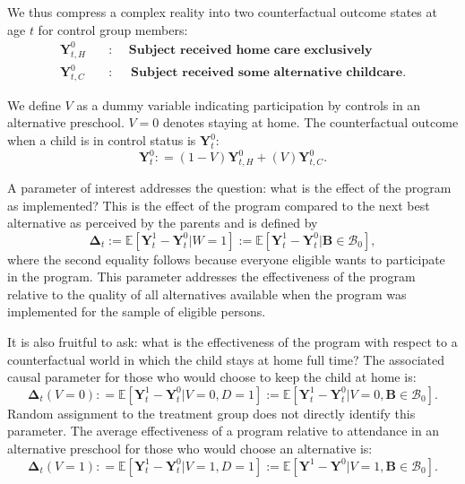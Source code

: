 We thus compress a complex reality into two counterfactual outcome states at age $t$ for control group members:
\begin{align*}
\bm{Y}_{t,H}^0 \quad &: \quad \textbf{ Subject received home care exclusively} \\
\bm{Y}_{t,C}^0 \quad &: \quad \textbf{ Subject received some alternative childcare}.
\end{align*}

We define $V$ as a dummy variable indicating participation by controls in an alternative preschool. $V=0$ denotes staying at home. The counterfactual outcome when a child is in control status is $\bm{Y}^0_t$:
\begin{equation}
\bm{Y}^0_t : = \left( 1 - V \right) \bm{Y}^0_{t,H} + \left( V \right) \bm{Y}^0_{t,C}.
\end{equation}

A parameter of interest addresses the question: what is the effect of the program as implemented? This is the effect of the program compared to the next best alternative as perceived by the parents and is defined by
\begin{equation}\label{eq:effect}
\bm{\Delta}_t := \mathbb{E} \left[ \bm{Y}^1_t -  \bm{Y}^0_t | W =1 \right] := \mathbb{E} \left[\bm{Y}^1_t - \bm{Y}^0_t | \bm{B} \in \mathcal{B}_0 \right],
\end{equation}
where the second equality follows because everyone eligible wants to participate in the program. This parameter addresses the effectiveness of the program relative to the quality of all alternatives available when the program was implemented for the sample of eligible persons.

It is also fruitful to ask: what is the effectiveness of the program with respect to a counterfactual world in which the child stays at home full time? The associated causal parameter for those who would choose to keep the child at home is:
\begin{equation}\label{eq:influenza}
\bm{\Delta}_t \left(V = 0 \right) : =   \mathbb{E} \left[ \bm{Y}^1_t - \bm{Y}^0_t | V = 0, D = 1 \right] := \mathbb{E} \left[\bm{Y}^1_t - \bm{Y}^0_t | V = 0, \bm{B} \in \mathcal{B}_0 \right].
\end{equation}
Random assignment to the treatment group does not directly identify this parameter. The average effectiveness of a program relative to attendance in an alternative preschool for those who would choose an alternative is:
\begin{equation}\label{eq:smallpox}
\bm{\Delta}_t \left( V =1 \right) : =   \mathbb{E} \left[ \bm{Y}^1_t - \bm{Y}^0_t | V = 1, D = 1 \right] := \mathbb{E} \left[\bm{Y}^1 - \bm{Y}^0 | V = 1, \bm{B} \in \mathcal{B}_0 \right].
\end{equation}

